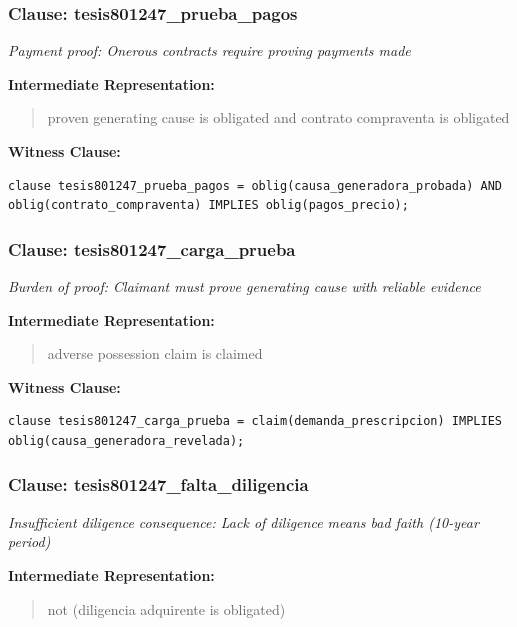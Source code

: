 \documentclass[11pt,a4paper]{article}
\begin{document}
\subsubsection{Clause: tesis801247\_prueba\_pagos}

\textit{Payment proof: Onerous contracts require proving payments made}

\textbf{Intermediate Representation:}

\begin{quote}
proven generating cause is obligated and contrato compraventa is obligated
\end{quote}

\textbf{Witness Clause:}

\begin{lstlisting}[style=witnessstyle, language=Witness]
clause tesis801247_prueba_pagos = oblig(causa_generadora_probada) AND oblig(contrato_compraventa) IMPLIES oblig(pagos_precio);
\end{lstlisting}

\subsubsection{Clause: tesis801247\_carga\_prueba}

\textit{Burden of proof: Claimant must prove generating cause with reliable evidence}

\textbf{Intermediate Representation:}

\begin{quote}
adverse possession claim is claimed
\end{quote}

\textbf{Witness Clause:}

\begin{lstlisting}[style=witnessstyle, language=Witness]
clause tesis801247_carga_prueba = claim(demanda_prescripcion) IMPLIES oblig(causa_generadora_revelada);
\end{lstlisting}

\subsubsection{Clause: tesis801247\_falta\_diligencia}

\textit{Insufficient diligence consequence: Lack of diligence means bad faith (10-year period)}

\textbf{Intermediate Representation:}

\begin{quote}
not (diligencia adquirente is obligated)
\end{quote}
\end{document}
